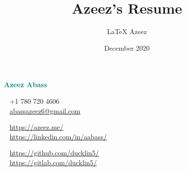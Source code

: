 \documentclass[a4paper]{modernsimplecv}
\title{Azeez's Resume}
\author{\LaTeX{} Azeez}
\date{December 2020}
\begin{document}
\thispagestyle{empty}


\vspace{-2em}
\begin{minipage}[t]{1.0\textwidth}
\begin{shaded*}
    \Huge
    \begin{minipage}[t]{\textwidth}
        \bfseries\FocusFont\textcolor{teal}{Azeez Abass}
        \raisebox{.3ex}{\Large$\cdot$ Software Engineer $\cdot$ Video Game and Web Developer}
    \end{minipage}
    \vspace{10pt}
    \footnotesize
    \begin{minipage}[t]{0.33\textwidth}
        \vspace{0pt} %
        \faPhone~ +1 780 720 4606 \\
        \faAt~ \url{abassazeez6@gmail.com} \\
    \end{minipage}
    \begin{minipage}[t]{0.33\textwidth}
        \vspace{0pt} %
        \faGlobe~ \url{https://azeez.me/} \\
        \faLinkedin~ \url{https://linkedin.com/in/aabass/} \\
    \end{minipage}
    \begin{minipage}[t]{0.33\textwidth}
        \vspace{0pt} %
        \faGithub~ \url{https://github.com/ducklin5/} \\
        \faGitlab~ \url{https://gitlab.com/ducklin5/} \\
    \end{minipage}
    \vspace{-2em}
\end{shaded*}
\end{minipage}\\

\newlength{\rightcolwidth}
\newlength{\leftcolwidth}
\setlength{\leftcolwidth}{0.485\textwidth}
\setlength{\rightcolwidth}{0.485\textwidth}
\end{document}
